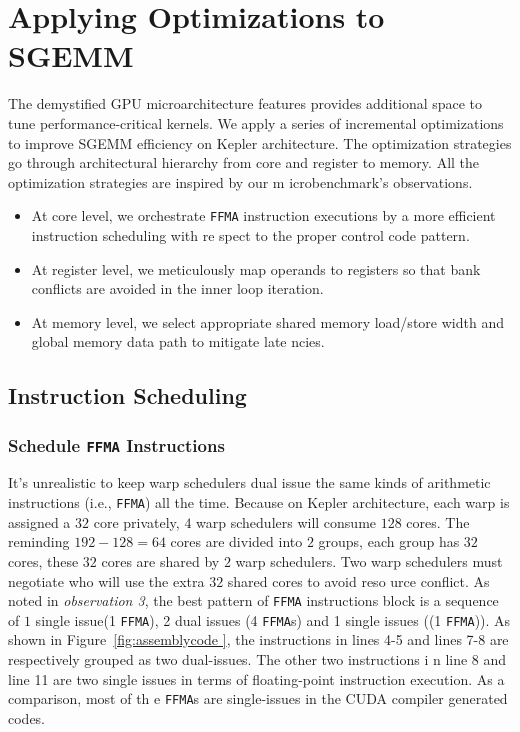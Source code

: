 \section{Applying Optimizations to SGEMM}
\label{sec:optimization}
The demystified GPU microarchitecture features provides additional space to tune performance-critical kernels. We apply 
a series of incremental optimizations to improve SGEMM efficiency on Kepler architecture. The optimization strategies go
 through architectural hierarchy from core and register to memory. All the optimization strategies are inspired by our m
icrobenchmark's observations.
\begin{itemize}
\item At core level, we orchestrate {\tt FFMA} instruction executions by a more efficient instruction scheduling with re
spect to the proper control code pattern.
\item At register level, we meticulously map operands to registers so that bank conflicts are avoided in the inner loop 
iteration.
\item At memory level, we select appropriate shared memory load/store width and global memory data path to mitigate late
ncies.
\end{itemize}

\subsection{Instruction Scheduling}
\subsubsection{Schedule {\tt FFMA} Instructions}
It's unrealistic to keep warp schedulers dual issue the same kinds of arithmetic instructions (i.e., {\tt FFMA}) all the
 time. Because on Kepler architecture, each warp is assigned a $32$ core privately, $4$ warp schedulers will consume $12
8$ cores. The reminding $192-128=64$ cores are divided into $2$ groups, each group has $32$ cores, these $32$ cores are 
shared by $2$ warp schedulers. Two warp schedulers must negotiate who will use the extra $32$ shared cores to avoid reso
urce conflict.
As noted in {\em observation 3}, the best pattern of {\tt FFMA} instructions block is a sequence of $1$ single issue(1 {
\tt FFMA}), 2 dual issues (4 {\tt FFMA}s) and 1 single issues ((1 {\tt FFMA})). As shown in Figure~\ref{fig:assemblycode
}, the instructions in lines 4-5 and lines 7-8 are respectively grouped as two dual-issues. The other two instructions i
n line 8 and line 11 are two single issues in terms of floating-point instruction execution. As a comparison, most of th
e {\tt FFMA}s are single-issues in the CUDA compiler generated codes.

